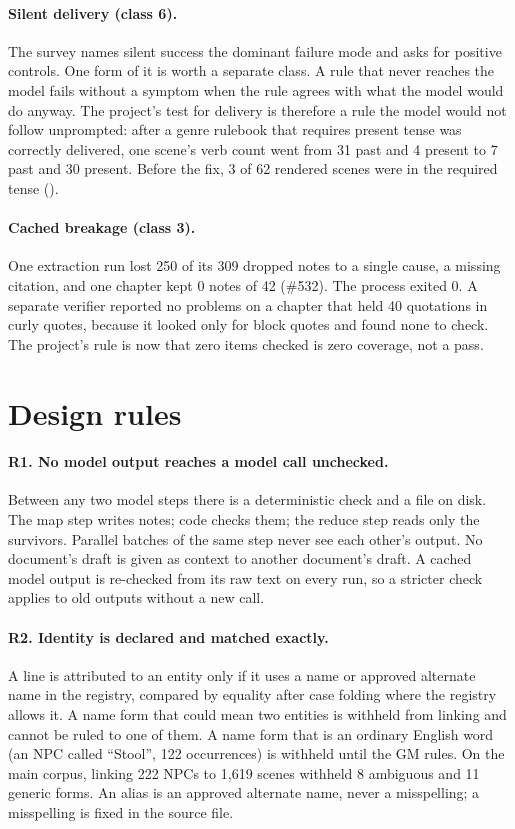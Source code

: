 \documentclass[11pt]{article}
\begin{document}
\paragraph{Silent delivery (class 6).} The survey names silent success the dominant
failure mode and asks for positive controls. One form of it is worth a separate class. A
rule that never reaches the model fails without
a symptom when the rule agrees with what the model would do anyway. The project's test
for delivery is therefore a rule the model would not follow unprompted: after a genre
rulebook that requires present tense was correctly delivered, one scene's verb count
went from 31 past and 4 present to 7 past and 30 present. Before the fix, 3 of 62
rendered scenes were in the required tense
().

\paragraph{Cached breakage (class 3).} One extraction run lost 250 of its 309 dropped
notes to a single cause, a missing citation, and one chapter kept 0 notes of 42 (\#532).
The process exited 0. A separate verifier reported no problems on a chapter that held 40
quotations in curly quotes, because it looked only for block quotes and found none to
check. The project's rule is now that zero items checked is zero coverage, not a pass.

\section{Design rules}
\label{sec:rules}

\paragraph{R1. No model output reaches a model call unchecked.} Between any two model
steps there is a deterministic check and a file on disk. The map step writes notes; code
checks them; the reduce step reads only the survivors. Parallel batches of the same step
never see each other's output. No document's draft is given as context to another
document's draft. A cached model output is re-checked from its raw text on every run, so
a stricter check applies to old outputs without a new call.

\paragraph{R2. Identity is declared and matched exactly.} A line is attributed to an
entity only if it uses a name or approved alternate name in the registry, compared by
equality after case folding where the registry allows it. A name form that could mean
two entities is withheld from linking and cannot be ruled to one of them. A name form
that is an ordinary English word (an NPC called ``Stool'', 122 occurrences) is withheld
until the GM rules. On the main corpus, linking 222 NPCs to 1{,}619 scenes withheld 8
ambiguous and 11 generic forms. An alias is an approved alternate name, never a
misspelling; a misspelling is fixed in the source file.
\end{document}
